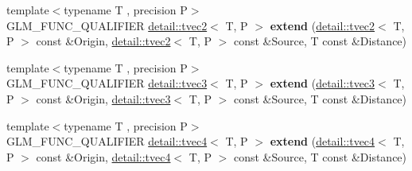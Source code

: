 \begin{DoxyCompactItemize}
\item 
{\footnotesize template$<$typename T , precision P$>$ }\\G\+L\+M\+\_\+\+F\+U\+N\+C\+\_\+\+Q\+U\+A\+L\+I\+F\+I\+ER \hyperlink{structglm_1_1detail_1_1tvec2}{detail\+::tvec2}$<$ T, P $>$ {\bfseries extend} (\hyperlink{structglm_1_1detail_1_1tvec2}{detail\+::tvec2}$<$ T, P $>$ const \&Origin, \hyperlink{structglm_1_1detail_1_1tvec2}{detail\+::tvec2}$<$ T, P $>$ const \&Source, T const \&Distance)\hypertarget{namespaceglm_ac0149acd341de18dc0d0e96e02438d08}{}\label{namespaceglm_ac0149acd341de18dc0d0e96e02438d08}

\item 
{\footnotesize template$<$typename T , precision P$>$ }\\G\+L\+M\+\_\+\+F\+U\+N\+C\+\_\+\+Q\+U\+A\+L\+I\+F\+I\+ER \hyperlink{structglm_1_1detail_1_1tvec3}{detail\+::tvec3}$<$ T, P $>$ {\bfseries extend} (\hyperlink{structglm_1_1detail_1_1tvec3}{detail\+::tvec3}$<$ T, P $>$ const \&Origin, \hyperlink{structglm_1_1detail_1_1tvec3}{detail\+::tvec3}$<$ T, P $>$ const \&Source, T const \&Distance)\hypertarget{namespaceglm_ac6db537bc391ad6631e114ac3ce2fde8}{}\label{namespaceglm_ac6db537bc391ad6631e114ac3ce2fde8}

\item 
{\footnotesize template$<$typename T , precision P$>$ }\\G\+L\+M\+\_\+\+F\+U\+N\+C\+\_\+\+Q\+U\+A\+L\+I\+F\+I\+ER \hyperlink{structglm_1_1detail_1_1tvec4}{detail\+::tvec4}$<$ T, P $>$ {\bfseries extend} (\hyperlink{structglm_1_1detail_1_1tvec4}{detail\+::tvec4}$<$ T, P $>$ const \&Origin, \hyperlink{structglm_1_1detail_1_1tvec4}{detail\+::tvec4}$<$ T, P $>$ const \&Source, T const \&Distance)\hypertarget{namespaceglm_a0d81de9b541fb273f3009b26e26e944e}{}\label{namespaceglm_a0d81de9b541fb273f3009b26e26e944e}


\end{DoxyCompactItemize}
